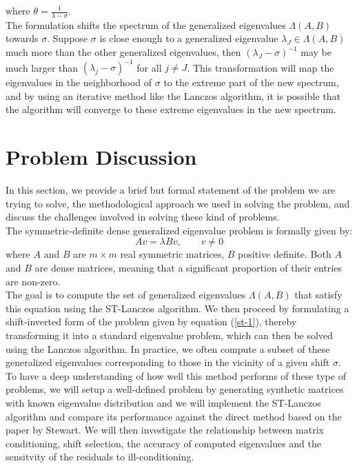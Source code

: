 where $\theta = \frac{1}{\lambda - \sigma}$.\\
The formulation shifts the spectrum of the generalized eigenvalues $\Lambda(A, B)$ towards $\sigma$. Suppose $\sigma$ is close enough to a generalized eigenvalue $\lambda_J \in \Lambda(A, B)$ much more than the other generalized eigenvalues, then $(\lambda_J - \sigma)^{-1}$ may be much larger than $(\lambda_j - \sigma)^{-1}$ for all $j \neq J$. This transformation will map the eigenvalues in the neighborhood of $\sigma$ to the extreme part of the new spectrum, and by using an iterative method like the Lanczos algorithm, it is possible that the algorithm will converge to these extreme eigenvalues in the new spectrum.
\section{Problem Discussion}
In this section, we provide a brief but formal statement of the problem we are trying to solve, the methodological approach we used in solving the problem, and discuss the challenges involved in solving these kind of problems.\\[5pt]
The symmetric-definite dense generalized eigenvalue problem is formally given by:
\begin{equation}
	Av = \lambda Bv, \qquad v \neq 0
\end{equation}
where $A$ and $B$ are $m \times m$ real symmetric matrices, $B$ positive definite. Both $A$ and $B$ are dense matrices, meaning that a significant proportion of their entries are non-zero.\\[5pt]
The goal is to compute the set of generalized eigenvalues $\Lambda(A, B)$ that satisfy this equation using the ST-Lanczos algorithm. We then proceed by formulating a shift-inverted form of the problem given by equation (\ref{st-1}), thereby transforming it into a standard eigenvalue problem, which can then be solved using the Lanczos algorithm. In practice, we often compute a subset of these generalized eigenvalues corresponding to those in the vicinity of a given shift $\sigma$. To have a deep understanding of how well this method performs of these type of problems, we will setup a well-defined problem by generating synthetic matrices with known eigenvalue distribution and we will implement the ST-Lanczos algorithm and compare its performance against the direct method based on the paper by Stewart. We will then investigate the relationship between matrix conditioning, shift selection, the accuracy of computed eigenvalues and the sensitvity of the residuals to ill-conditioning.
